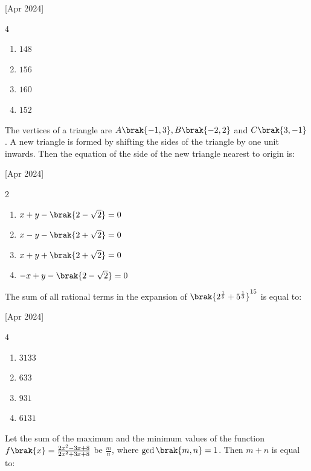     \hfill{[Apr 2024]}

        \begin{multicols}{4}
            \begin{enumerate}
                \item $148$
                \item $156$
                \item $160$
                \item $152$
            \end{enumerate}
        \end{multicols}

    \item The vertices of a triangle are $A\brak{-1,3},B\brak{-2,2}$ and $C\brak{3,-1}$. A new triangle is formed by shifting the sides of the triangle by one unit inwards. Then the equation of the side of the new triangle nearest to origin is:
    
    \hfill{[Apr 2024]}

		\begin{multicols}{2}
			\begin{enumerate}
				\item $x+y-\brak{2-\sqrt{2}}=0$
				\item $x-y-\brak{2+\sqrt{2}}=0$
				\item $x+y+\brak{2+\sqrt{2}}=0$
				\item $-x+y-\brak{2-\sqrt{2}}=0$
			\end{enumerate}
		\end{multicols}

    \item The sum of all rational terms in the expansion of $\brak{2^\frac{1}{5}+5^\frac{1}{3}}^{15}$ is equal to:
    
    \hfill{[Apr 2024]}

		\begin{multicols}{4}
			\begin{enumerate}
				\item $3133$
				\item $633$
				\item $931$
				\item $6131$
			\end{enumerate}
		\end{multicols}
  
    \item Let the sum of the maximum and the minimum values of the function $f\brak{x}=\frac{2x^2-3x+8}{2x^2+3x+8}$ be $\frac{m}{n}$, where $\gcd\brak{m,n}=1$. Then $m+n$ is equal to:
    
